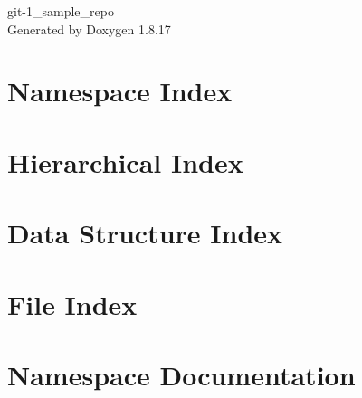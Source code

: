 \let\mypdfximage\pdfximage\def\pdfximage{\immediate\mypdfximage}\documentclass[twoside]{book}
\newcommand{\+}{\discretionary{\mbox{\scriptsize$\hookleftarrow$}}{}{}}
\newcommand{\clearemptydoublepage}{%
  \newpage{\pagestyle{empty}\cleardoublepage}%
}
\begin{document}
\hypersetup{pageanchor=false,
             bookmarksnumbered=true,
             pdfencoding=unicode
            }
\begin{titlepage}
\vspace*{7cm}
\begin{center}%
{\Large git-\/1\+\_\+sample\+\_\+repo }\\
\vspace*{1cm}
{\large Generated by Doxygen 1.8.17}\\
\end{center}
\end{titlepage}
\clearemptydoublepage
{}
\tableofcontents
\clearemptydoublepage
{}
\hypersetup{pageanchor=true}

\chapter{Namespace Index}

\chapter{Hierarchical Index}

\chapter{Data Structure Index}

\chapter{File Index}

\chapter{Namespace Documentation}













\end{document}
